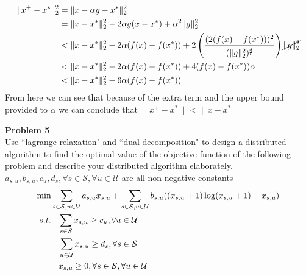 \documentclass[12pt,letter]{article}
\newcommand{\problem}[1]{\vspace{3mm}\Large\textbf{{Problem {#1}\vspace{3mm}}}\normalsize\\}
\begin{document}
\begin{align*}
\|x^+ - x^*\|_2^2 &= \|x-\alpha g - x^*\|_2^2 \\
		  &= \|x-x^*\|_2^2 - 2\alpha g(x-x^*) + \alpha^2 \|g\|_2^2\\
		  &< \|x-x^*\|_2^2 - 2\alpha(f(x)-f(x^*)) + 2\left(\frac{(2(f(x)-f(x^*)))^2}{(\|g\|_2^2)^{\cancel{2}}}\right)\cancel{\|g\|_2^2}\\
		  &< \|x-x^*\|_2^2 - 2\alpha(f(x)-f(x^*)) + 4(f(x)-f(x^*))\alpha\\
		  &< \|x-x^*\|_2^2 - 6\alpha(f(x)-f(x^*))
\end{align*}
From here we can see that because of the extra term and the upper bound provided
to $\alpha$ we can conclude that $\|x^+-x^*\| < \|x-x^*\|$

\problem{5}
Use ``lagrange relaxation" and ``dual decomposition" to design a distributed 
algorithm to find the optimal value of the objective function of the following 
problem and describe your distributed algorithm elaborately. 
$a_{s,u}, b_{s,u}, c_u, d_s, \forall s\in \mathcal{S}, \forall u \in \mathcal{U}$
are all non-negative constants
\begin{align*}
\min\hspace{3mm}&\hspace{-3mm}\sum\limits_{s\in\mathcal{S},u\in\mathcal{U}}a_{s,u}x_{s,u} + 
	\sum\limits_{s\in\mathcal{S},u\in\mathcal{U}}b_{s,u}((x_{s,u}+1)\log(x_{s,u}+1)-x_{s,u})\\
s.t.\hspace{3mm} &\sum\limits_{s\in\mathcal{S}}x_{s,u}\geq c_u, \forall u\in\mathcal{U}\\ 
     &\sum\limits_{u\in\mathcal{U}}x_{s,u}\geq d_s, \forall s\in\mathcal{S}\\
     &x_{s,u}\geq 0, \forall s\in\mathcal{S}, \forall u\in\mathcal{U}
\end{align*}
\end{document}
